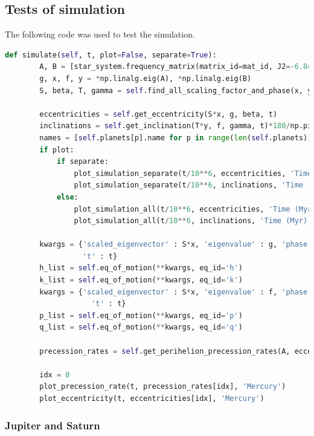 \documentclass[11pt, oneside]{article}   	%
\begin{document}
\subsection{Tests of simulation}
The following code was used to test the simulation.
\begin{lstlisting}[language=Python, caption={Test code for simulation}]
    def simulate(self, t, plot=False, separate=True):
        A, B = [star_system.frequency_matrix(matrix_id=mat_id, J2=-6.84*10**(-7), J4=2.8*10**(-12)) for mat_id in ['A', 'B']]
        g, x, f, y = *np.linalg.eig(A), *np.linalg.eig(B)
        S, beta, T, gamma = self.find_all_scaling_factor_and_phase(x, y)

        eccentricities = self.get_eccentricity(S*x, g, beta, t)
        inclinations = self.get_inclination(T*y, f, gamma, t)*180/np.pi
        names = [self.planets[p].name for p in range(len(self.planets))]
        if plot:
            if separate:
                plot_simulation_separate(t/10**6, eccentricities, 'Time (Myr)', 'Eccentricity', names)
                plot_simulation_separate(t/10**6, inclinations, 'Time (Myr)', 'Inclination', names)
            else:
                plot_simulation_all(t/10**6, eccentricities, 'Time (Myr)', 'Eccentricity', names)
                plot_simulation_all(t/10**6, inclinations, 'Time (Myr)', 'Inclination', names)

        kwargs = {'scaled_eigenvector' : S*x, 'eigenvalue' : g, 'phase' : beta,
                  't' : t}
        h_list = self.eq_of_motion(**kwargs, eq_id='h')
        k_list = self.eq_of_motion(**kwargs, eq_id='k')
        kwargs = {'scaled_eigenvector' : S*x, 'eigenvalue' : f, 'phase' : gamma,
                    't' : t}
        p_list = self.eq_of_motion(**kwargs, eq_id='p')
        q_list = self.eq_of_motion(**kwargs, eq_id='q')

        precession_rates = self.get_perihelion_precession_rates(A, eccentricities, h_list, k_list)

        idx = 0
        plot_precession_rate(t, precession_rates[idx], 'Mercury')
        plot_eccentricity(t, eccentricities[idx], 'Mercury')
\end{lstlisting}

\subsubsection{Jupiter and Saturn}
\end{document}
